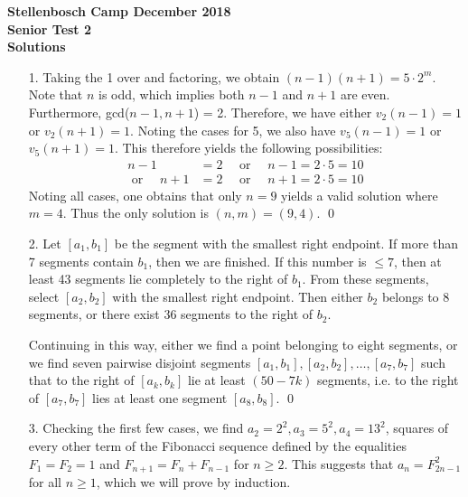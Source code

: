 \documentclass[a4paper, 12pt]{article}
\begin{document}
\begin{center}
\textbf{Stellenbosch Camp December 2018 \\ Senior Test 2} \\
\textbf{Solutions}
\end{center}
\vspace{5mm}

\begin{enumerate}

    \item[1.]   Taking the 1 over and factoring, we obtain $(n-1)(n+1) = 5 \cdot 2^m$. Note that $n$ is odd, which implies both $n-1$ and $n+1$ are even. Furthermore, gcd($n-1, n+1$) = 2. Therefore, we have either $v_2(n-1) = 1$ or $v_2(n+1) = 1$. Noting the cases for 5, we also have $v_5(n-1) = 1$ or $v_5(n+1) = 1$. This therefore yields the following possibilities:
\begin{align*}
    n - 1 &= 2 \quad \textrm{ or } \quad n - 1 = 2 \cdot 5 = 10 \\
    \textrm{ or } \quad  n + 1 &= 2 \quad \textrm{ or } \quad n + 1 = 2 \cdot 5 = 10 
\end{align*}
Noting all cases, one obtains that only $n=9$ yields a valid solution where $m = 4$. Thus the only solution is $(n, m) = (9, 4)$. \qed \\
    \vspace{5mm}
    
    \item[2.]  Let $[a_1, b_1]$ be the segment with the smallest right endpoint. If more than 7 segments contain $b_1$, then we are finished. If this number is $\leq 7$, then at least 43 segments lie completely to the right of $b_1$. From these segments, select $[a_2, b_2]$ with the smallest right endpoint. Then either $b_2$ belongs to 8 segments, or there exist 36 segments to the right of $b_2$.
    
    Continuing in this way, either we find a point belonging to eight segments, or we find seven pairwise disjoint segments $[a_1, b_1], [a_2, b_2], \dots, [a_7, b_7]$ such that to the right of $[a_k, b_k]$ lie at least $(50-7k)$ segments, i.e. to the right of $[a_7, b_7]$ lies at least one segment $[a_8, b_8]$.     \qed \\
    \vspace{5mm}
    
    \item[3.] Checking the first few cases, we find $a_2 = 2^2, a_3 = 5^2, a_4 = 13^2$, squares of every other term of the Fibonacci sequence defined by the equalities $F_1 = F_2 = 1$ and $F_{n+1} = F_n + F_{n-1}$ for $n \geq 2$. This suggests that $a_n = F_{2n-1}^2$ for all $n \geq 1$, which we will prove by induction.
    

\end{enumerate}
\end{document}
